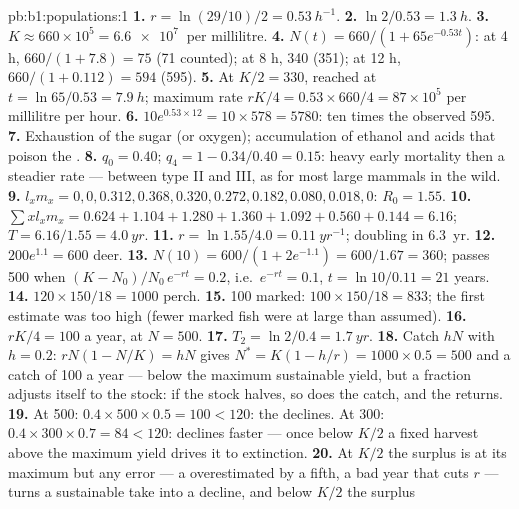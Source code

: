 \begin{solution}{pb:b1:populations:1}
\textbf{1.} $r = \ln(29/10)/2 = \qty{0.53}{h^{-1}}$.
\textbf{2.} $\ln 2/0.53 = \qty{1.3}{h}$.
\textbf{3.} $K \approx 660\times 10^5 = \qty{6.6e7}{}$  per
millilitre.
\textbf{4.} $N(t) = 660/(1 + 65e^{-0.53t})$: at 4 h, $660/(1 + 7.8) =
75$ (71 counted); at 8 h, 340 (351); at 12 h, $660/(1 + 0.112) = 594$
(595).
\textbf{5.} At $K/2 = 330$, reached at $t = \ln 65/0.53 = \qty{7.9}{h}$;
maximum rate $rK/4 = 0.53\times 660/4 = 87\times 10^5$  per
millilitre per hour.
\textbf{6.} $10e^{0.53\times 12} = 10\times 578 = 5780$: ten times the
observed 595.
\textbf{7.} Exhaustion of the sugar (or oxygen); accumulation of
ethanol and acids that poison the .
\textbf{8.} $q_0 = 0.40$; $q_4 = 1 - 0.34/0.40 = 0.15$: heavy early
mortality then a steadier rate --- between type II and III, as for
most large mammals in the wild.
\textbf{9.} $l_x m_x = 0, 0, 0.312, 0.368, 0.320, 0.272, 0.182, 0.080,
0.018, 0$: $R_0 = 1.55$.
\textbf{10.} $\sum x l_x m_x = 0.624 + 1.104 + 1.280 + 1.360 + 1.092 +
0.560 + 0.144 = 6.16$; $T = 6.16/1.55 = \qty{4.0}{yr}$.
\textbf{11.} $r = \ln 1.55/4.0 = \qty{0.11}{yr^{-1}}$; doubling in
\qty{6.3}{yr}.
\textbf{12.} $200e^{1.1} = 600$ deer.
\textbf{13.} $N(10) = 600/(1 + 2e^{-1.1}) = 600/1.67 = 360$; passes 500
when $(K - N_0)/N_0\,e^{-rt} = 0.2$, i.e.\ $e^{-rt} = 0.1$, $t = \ln
10/0.11 = 21$ years.
\textbf{14.} $120\times 150/18 = 1000$ perch.
\textbf{15.} 100 marked: $100\times 150/18 = 833$; the first estimate
was too high (fewer marked fish were at large than assumed).
\textbf{16.} $rK/4 = 100$ a year, at $N = 500$.
\textbf{17.} $T_2 = \ln 2/0.4 = \qty{1.7}{yr}$.
\textbf{18.} Catch $hN$ with $h = 0.2$: $rN(1 - N/K) = hN$ gives $N^* =
K(1 - h/r) = 1000\times 0.5 = 500$ and a catch of \num{100} a year ---
below the maximum sustainable yield, but a fraction adjusts itself to
the stock: if the stock halves, so does the catch, and the 
returns.
\textbf{19.} At 500: $0.4\times 500\times 0.5 = 100 < 120$: the
 declines. At 300: $0.4\times 300\times 0.7 = 84 < 120$:
declines faster --- once below $K/2$ a fixed harvest above the maximum
yield drives it to extinction.
\textbf{20.} At $K/2$ the surplus is at its maximum but any error ---
a  overestimated by a fifth, a bad year that cuts $r$ ---
turns a sustainable take into a decline, and below $K/2$ the surplus

\end{solution}
